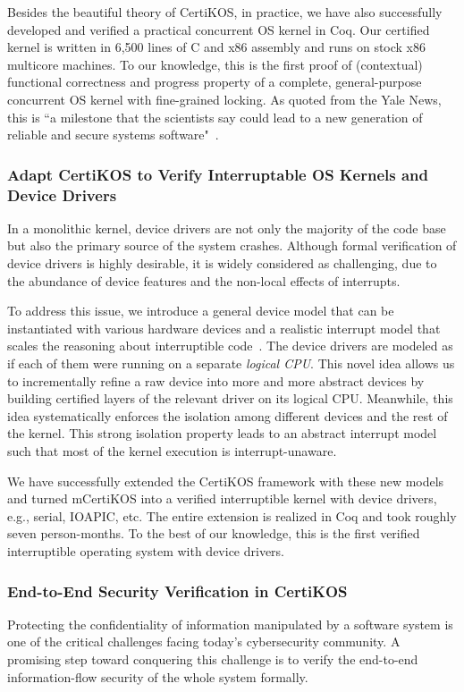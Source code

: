 \documentclass[a4paper, 10pt]{article}
\begin{document}
\begin{small}
 
Besides the beautiful theory of CertiKOS, in practice,
we have also successfully developed and verified a practical concurrent OS
kernel in Coq. Our certified kernel is written in 6,500 lines of
C and x86 assembly and runs on stock x86 multicore
machines. To our knowledge, this is the first proof of
(contextual) functional correctness and progress
property of a complete, general-purpose
concurrent OS kernel with fine-grained locking.
As quoted from the Yale News, this is ``a milestone that the scientists say could lead to a new generation of reliable and secure systems software"~\cite{news}.

\subsubsection*{\small Adapt CertiKOS to Verify Interruptable OS Kernels and Device Drivers}
In a monolithic kernel,
device drivers are not only the majority of the code base
but also the primary source of the system crashes.
Although formal verification of device drivers is highly desirable, it is widely considered as challenging, due to the abundance of device features
and the non-local effects of interrupts.

To address this issue, we introduce
a general device model that can be
instantiated with various hardware devices and a realistic
interrupt model that scales the reasoning
about interruptible code~\cite{pldi16-device}. 
The device drivers are modeled
as if each of them were running on a  separate \emph{logical CPU}. This novel idea allows us to
incrementally refine a raw
device into more and more abstract devices
by building certified layers of the relevant driver on its logical CPU.
Meanwhile, this idea systematically enforces
the isolation among different devices and the
rest of the kernel. This strong isolation property 
leads to an abstract interrupt model such that
most of the kernel execution is interrupt-unaware.

We have successfully extended the CertiKOS framework with these new models
and turned mCertiKOS
into a verified interruptible kernel with device
drivers, e.g., serial, IOAPIC, etc. 
The entire extension is realized in Coq and took roughly seven person-months.
To the best of our knowledge, this is the first verified
interruptible operating system with device drivers.

\subsubsection*{\small End-to-End Security Verification in CertiKOS}
Protecting the confidentiality of information manipulated by
a software system is one of the critical challenges
facing today's cybersecurity community. A promising step
toward conquering this challenge is to  verify  the
end-to-end information-flow
security of the whole system formally. 


\end{small}
\end{document}
